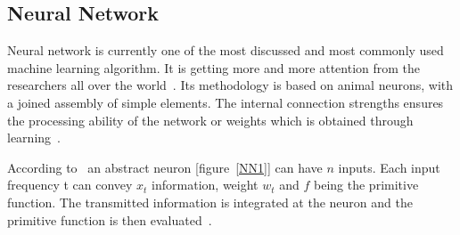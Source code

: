 \begin{figure}
\centering
{}
\end{figure}



\subsection{Neural Network}
\label{NN}

Neural network is currently one of the most discussed and most commonly used machine learning algorithm. It is getting more and more attention from the researchers all over the world~\cite{rojas2013neural}. Its methodology is based on animal neurons, with a joined assembly of simple elements. The internal connection strengths ensures the processing ability of the network or weights which is obtained through learning~\cite{gurney1997introduction}. 

According to~\cite{rojas2013neural} an abstract neuron [figure~\ref{NN1}] can have $n$ inputs. Each input frequency t can convey $x_t$ information, weight $w_t$ and $f$ being the primitive function. The transmitted information is integrated at the neuron and the primitive function is then evaluated~\cite{rojas2013neural}.

